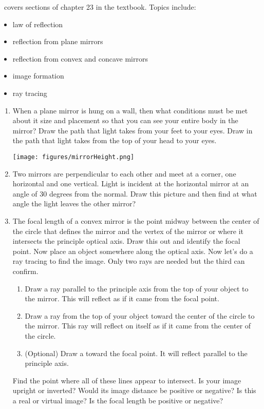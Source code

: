 \week \ covers sections of chapter 23 in the textbook. Topics include:

\begin{itemize}
	\item law of reflection
	\item reflection from plane mirrors
	\item reflection from convex and concave mirrors
	\item image formation
	\item ray tracing

\end{itemize}

\begin{enumerate}
\setlength\itemsep{2 in}

\item 
When a plane mirror is hung on a wall, then what conditions must be met about it size and placement so that you can see your entire body in the mirror? Draw the path that light takes from your feet to your eyes. Draw in the path that light takes from the top of your head to your eyes. 

\texttt{[image: figures/mirrorHeight.png]}

\item
Two mirrors are perpendicular to each other and meet at a corner, one horizontal and one vertical. Light is incident at the horizontal mirror at an angle of 30 degrees from the normal. Draw this picture and then find at what angle the light leaves the other mirror?

\item
The focal length of a convex mirror is the point midway between the center of the circle that defines the mirror and the vertex of the mirror or where it intersects the principle optical axis. Draw this out and identify the focal point. Now place an object somewhere along the optical axis. Now let's do a ray tracing to find the image. Only two rays are needed but the third can confirm.
\begin{enumerate}
	\item Draw a ray parallel to the principle axis from the top of your object to the mirror. This will reflect as if it came from the focal point.
	\item Draw a ray from the top of your object toward the center of the circle to the mirror. This ray will reflect on itself as if it came from the center of the circle.
	\item (Optional) Draw a toward the focal point. It will reflect parallel to the principle axis.
\end{enumerate}
Find the point where all of these lines appear to intersect. Is your image upright or inverted? Would its image distance be positive or negative? Is this a real or virtual image? Is the focal length be positive or negative?\giantskip


\end{enumerate}
